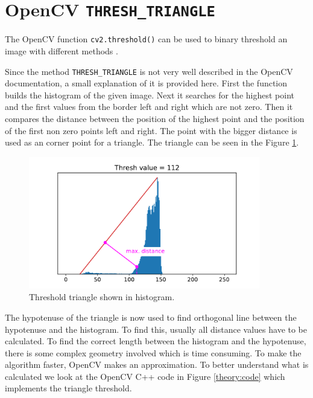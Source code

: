 \section{OpenCV \texttt{THRESH\_TRIANGLE}}
The OpenCV function \texttt{cv2.threshold()} can be used to binary threshold an image with different methods \cite{cv_thresh}.

Since the method \texttt{THRESH\_TRIANGLE} is not very well described in the OpenCV documentation, a small explanation of it is provided here. First the function builds the histogram of the given image. Next it searches for the highest point and the first values from the border left and right which are not zero. Then it compares the distance between the position of the highest point and the position of the first non zero points left and right. The point with the bigger distance is used as an corner point for a triangle. The triangle can be seen in the Figure \ref{theory:triangle}.
\begin{figure}[ht]
	\centering
	\includegraphics[width=0.9\textwidth]{2-theory/threshold/triangle.pdf}
	\caption{Threshold triangle shown in histogram.\label{theory:triangle}}
\end{figure} 
The hypotenuse of the triangle is now used to find orthogonal line between the hypotenuse and the histogram. To find this, usually all distance values have to be calculated. To find the correct length between the histogram and the hypotenuse, there is some complex geometry involved which is time consuming. To make the algorithm faster, OpenCV makes an approximation. To better understand what is calculated we look at the OpenCV C++ code in Figure \ref{theory:code} which implements the triangle threshold. 


